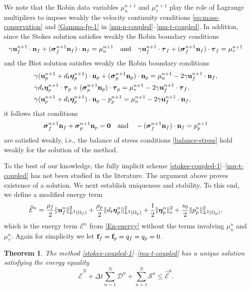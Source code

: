 \documentclass[11pt]{article}
\def\u{{\bf u}}
\def\n{{\bf n}}
\def\f{{\bf f}}
\def\btau{\boldsymbol{\tau}}
\def\bbeta{\boldsymbol{\eta}}
\def\bs{\boldsymbol{\sigma}}
\def\O{\Omega}
\def\dt{d_t}
\newtheorem{theorem}{Theorem}[section]
\begin{document}
%
We note that the Robin data variables $\mu_n^{n+1}$ and $\mu_\tau^{n+1}$ play the role of Lagrange multipliers to impose weakly the velocity continuity conditions \eqref{eq:mass-conservation} and \eqref{Gamma-fp-1} in \eqref{mu-n-coupled}--\eqref{mu-t-coupled}.
In addition, since the Stokes solution satisfies weakly the Robin boundary conditions
%
$$
\gamma\u_f^{n+1}\cdot\n_f + (\bs_f^{n+1} \n_f)\cdot\n_f = \mu_n^{n+1} \quad \text{and} \quad \gamma\u_f^{n+1}\cdot\btau_{f} +  (\bs_f^{n+1}\n_f)\cdot\btau_{f} = \mu_{\tau}^{n+1}
$$
%
and the Biot solution satisfies weakly the Robin boundary conditions
%
\begin{align*}
& \gamma(\u_p^{n+1} + \dt\bbeta_p^{n+1})\cdot\n_p + (\bs_p^{n+1} \n_p)\cdot\n_p
= \mu_n^{n+1} - 2\gamma\u_f^{n+1}\cdot\n_f, \\
&
\gamma \dt \bbeta_p^{n+1}\cdot\btau_{p} + (\bs_p^{n+1}\n_p)\cdot\btau_{p}
= \mu_{\tau}^{n+1} - 2\gamma\u_f^{n+1}\cdot\btau_f, \\
&\gamma(\u_p^{n+1} + \dt\bbeta_p^{n+1})\cdot\n_p - p_p^{n+1}
 = \mu_n^{n+1} - 2\gamma\u_f^{n+1}\cdot\n_f,
\end{align*}
%
it follows that conditions
%
$$
\bs_f^{n+1} \n_f + \bs_p^{n+1} \n_p = \boldsymbol{0} \quad \text{and} \quad -(\bs_f^{n+1} \n_f)\cdot\n_f = p_p^{n+1}
$$
%
are satisfied weakly, i.e., the balance of stress conditions \eqref{balance-stress} hold weakly for the solution of the method.

To the best of our knowledge, the fully implicit scheme \eqref{stokes-coupled-1}--\eqref{mu-t-coupled} has not been studied in the literature. The argument above proves existence of a solution. We next establish uniqueness and stability. To this end, we define a modified energy term
%  
$$
\widehat{\mathcal{E}}^n = \frac{\rho_f}{2}\|\u_f^n\|_{L^2(\O_f)}^2 + \frac{\rho_p}{2}\|\dt\bbeta_{p}^n\|_{L^2(\O_p)}^2 + \frac{1}{2}\|\bbeta_p^n\|_e^2
  + \frac{s_0}{2}\|p_{p}^n\|_{L^2(\O_p)}^2,
$$
%
  which is the energy term $\mathcal{E}^n$ from \eqref{En-energy} without the terms involving $\mu_n^n$ and $\mu_\tau^n$. Again for simplicity we let $\f_f = \f_p = q_f = q_p = 0$.

\begin{theorem}
The method \eqref{stokes-coupled-1}--\eqref{mu-t-coupled} has a unique solution satisfying the energy equality
%  
\begin{equation}\label{energy-coupled}
\widehat{\mathcal{E}}^N + \Delta t \sum_{n=1}^N \mathcal{D}^n + \sum_{n=1}^N \mathcal{S}^n \le \widehat{\mathcal{E}}^0.
\end{equation}
%
\end{theorem}
\end{document}
